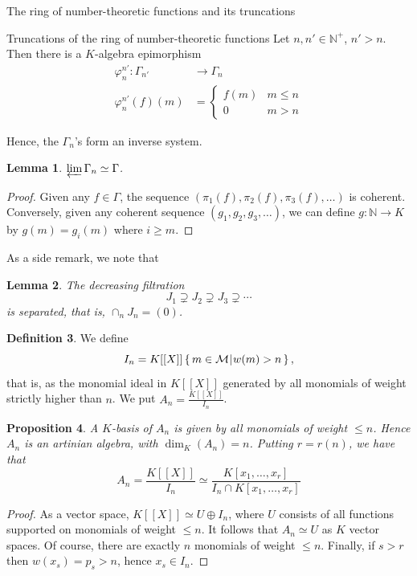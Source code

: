 \documentclass[reqno,10pt]{amsart}
\newcommand{\invhom}[2]{\varphi_{{#2}}^{{#1}}}
\theoremstyle{definition}
\newtheorem{definition}{Definition}[section]
\theoremstyle{remark}
\theoremstyle{plain}
\newtheorem{lemma}[definition]{Lemma}
\newtheorem{proposition}[definition]{Proposition}
\newcommand{\Nat}{{\mathbb{N}}}
\def\setsuchas#1#2{\left\{\,{#1}\,\vrule\,{#2}\,\right\}}
\newcommand{\M}{\mathcal{M}}
\begin{document}
\begin{section}{The ring of number-theoretic functions  and its
  truncations}
\begin{subsection}{Truncations of the ring of number-theoretic
  functions} 
Let \(n,n' \in \Nat^+\), \(n' > n\). Then there is a \(K\)-algebra epimorphism 
\begin{align*}
\invhom{n'}{n}: \Gamma_{n'} &\to \Gamma_n \\
\invhom{n'}{n}(f)(m)  & = 
\begin{cases}
  f(m) & m \le n \\
  0 & m > n
\end{cases}
\end{align*}

Hence, the \(\Gamma_n\)'s form an inverse system.
\begin{lemma}\label{lemma:invlim}
  \(\varprojlim \Gamma_n \simeq \Gamma\).
\end{lemma}
\begin{proof}
Given any \(f \in \Gamma\), the sequence \((\pi_1(f), \pi_2(f),
\pi_3(f),\dots)\) is coherent. Conversely, given any coherent sequence
\((g_1,g_2,g_3,\dots)\), we can define \(g: \Nat \to K\) by \(g(m) =
g_i(m)\) where \(i \ge m\).
\end{proof}
As a side remark, we note that 
\begin{lemma}
  The decreasing filtration 
  \begin{equation}
    \label{eq:Jnfilt}
    J_1 \supsetneq J_2 \supsetneq J_3 \supsetneq \cdots
  \end{equation}
  is separated, that is, \(\cap_{n} J_n = (0)\).
\end{lemma}


\begin{definition}
We define 
\begin{equation}\label{eqn:In}
  I_n = K[[X]] \setsuchas{m \in \M}{w(m) > n},
\end{equation}
that is, as the monomial ideal in \(K[[X]]\) generated by all
monomials of weight strictly higher than \(n\). 
We put  \(A_n = \frac{K[[X]]}{I_n}\).  
\end{definition}

\begin{proposition}
A \(K\)-basis of \(A_n\) is given by all monomials of weight \(\le n\).
Hence \(A_n\) is an artinian algebra, with \(\dim_K(A_n) = n\).
Putting \(r=r(n)\), we have that 
\begin{equation}\label{eq:An}
  A_n = \frac{K[[X]]}{I_n} \simeq \frac{K[x_1,\dots,x_r]}{I_n \cap
    K[x_1,\dots,x_r]} 
\end{equation}  
\end{proposition}
\begin{proof}
  As a vector space, \(K[[X]] \simeq U \oplus I_n\), where \(U\)
  consists of all functions supported on monomials of weight 
  \(\le  n\). It follows that \(A_n \simeq U\) as \(K\) vector
  spaces. Of course, there are exactly \(n\) monomials of weight 
  \(\le n\). Finally, if \(s > r\) then \(w(x_s) = p_s > n\), hence
  \(x_s \in I_n\).
\end{proof}



\end{subsection}
\end{section}
\end{document}
